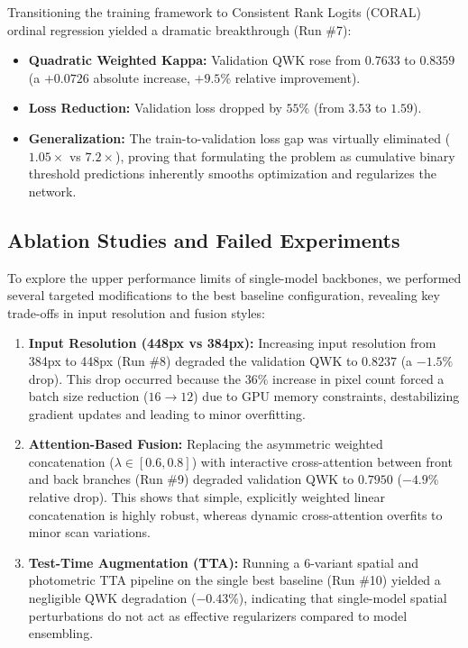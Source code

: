 \documentclass[12pt]{article}
\begin{document}
Transitioning the training framework to Consistent Rank Logits (CORAL) ordinal regression yielded a dramatic breakthrough (Run \#7):
\begin{itemize}
    \item \textbf{Quadratic Weighted Kappa:} Validation QWK rose from $0.7633$ to \textbf{$0.8359$} (a $+0.0726$ absolute increase, $+9.5\%$ relative improvement).
    \item \textbf{Loss Reduction:} Validation loss dropped by $55\%$ (from $3.53$ to $1.59$).
    \item \textbf{Generalization:} The train-to-validation loss gap was virtually eliminated ($1.05\times$ vs $7.2\times$), proving that formulating the problem as cumulative binary threshold predictions inherently smooths optimization and regularizes the network.
\end{itemize}

\subsection{Ablation Studies and Failed Experiments}
To explore the upper performance limits of single-model backbones, we performed several targeted modifications to the best baseline configuration, revealing key trade-offs in input resolution and fusion styles:
\begin{enumerate}
    \item \textbf{Input Resolution (448px vs 384px):} Increasing input resolution from 384px to 448px (Run \#8) degraded the validation QWK to $0.8237$ (a $-1.5\%$ drop). This drop occurred because the $36\%$ increase in pixel count forced a batch size reduction ($16 \to 12$) due to GPU memory constraints, destabilizing gradient updates and leading to minor overfitting.
    \item \textbf{Attention-Based Fusion:} Replacing the asymmetric weighted concatenation ($\lambda \in [0.6, 0.8]$) with interactive cross-attention between front and back branches (Run \#9) degraded validation QWK to $0.7950$ ($-4.9\%$ relative drop). This shows that simple, explicitly weighted linear concatenation is highly robust, whereas dynamic cross-attention overfits to minor scan variations.
    \item \textbf{Test-Time Augmentation (TTA):} Running a 6-variant spatial and photometric TTA pipeline on the single best baseline (Run \#10) yielded a negligible QWK degradation ($-0.43\%$), indicating that single-model spatial perturbations do not act as effective regularizers compared to model ensembling.
\end{enumerate}
\end{document}

